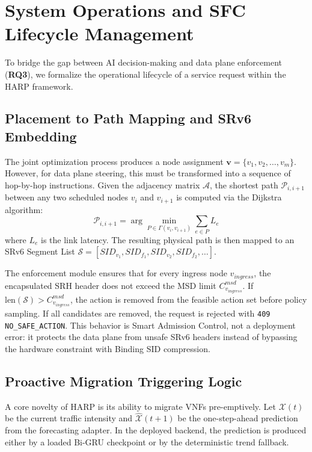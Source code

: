 \documentclass[12pt, a4paper, reqno, oneside]{book}
\begin{document}
\section{System Operations and SFC Lifecycle Management}
To bridge the gap between AI decision-making and data plane enforcement (\textbf{RQ3}), we formalize the operational lifecycle of a service request within the HARP framework.

\subsection{Placement to Path Mapping and SRv6 Embedding}
The joint optimization process produces a node assignment $\mathbf{v} = \{v_1, v_2, \dots, v_m\}$. However, for data plane steering, this must be transformed into a sequence of hop-by-hop instructions. Given the adjacency matrix $\mathcal{A}$, the shortest path $\mathcal{P}_{i, i+1}$ between any two scheduled nodes $v_i$ and $v_{i+1}$ is computed via the Dijkstra algorithm:
\begin{equation}
\mathcal{P}_{i, i+1} = \arg \min_{P \in \Gamma(v_i, v_{i+1})} \sum_{e \in P} L_e
\end{equation}
where $L_e$ is the link latency. The resulting physical path is then mapped to an SRv6 Segment List $\mathcal{S} = [SID_{v_1}, SID_{f_1}, SID_{v_2}, SID_{f_2}, \dots]$. 

The enforcement module ensures that for every ingress node $v_{ingress}$, the encapsulated SRH header does not exceed the MSD limit $C_{v_{ingress}}^{msd}$. If $\text{len}(\mathcal{S}) > C_{v_{ingress}}^{msd}$, the action is removed from the feasible action set before policy sampling. If all candidates are removed, the request is rejected with \texttt{409 NO\_SAFE\_ACTION}. This behavior is Smart Admission Control, not a deployment error: it protects the data plane from unsafe SRv6 headers instead of bypassing the hardware constraint with Binding SID compression.

\subsection{Proactive Migration Triggering Logic}
A core novelty of HARP is its ability to migrate VNFs pre-emptively. Let $\mathcal{X}(t)$ be the current traffic intensity and $\hat{\mathcal{X}}(t+1)$ be the one-step-ahead prediction from the forecasting adapter. In the deployed backend, the prediction is produced either by a loaded Bi-GRU checkpoint or by the deterministic trend fallback.
\end{document}
